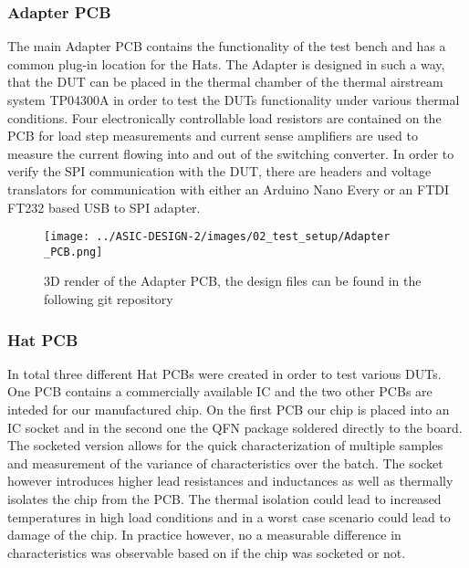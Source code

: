 \clearpage

\subsubsection{Adapter PCB}
The main Adapter \ac{PCB} contains the functionality of the test bench and has a common plug-in location for the Hats. The Adapter is designed in such a way, that the \ac{DUT} can be placed in the thermal chamber of the thermal airstream system TP04300A in order to test the \ac{DUT}s functionality under various thermal conditions. Four electronically controllable load resistors are contained on the \ac{PCB} for load step measurements and current sense amplifiers are used to measure the current flowing into and out of the switching converter. In order to verify the SPI communication with the \ac{DUT}, there are headers and voltage translators for communication with either an Arduino Nano Every or an FTDI FT232 based USB to SPI adapter.

\begin{figure}[h]
    \centering
    \texttt{[image: ../ASIC-DESIGN-2/images/02\_test\_setup/Adapter \_PCB.png]}
    \caption{3D render of the Adapter PCB, the design files can be found in the following git repository \cite{PCB_schematic}}
    \label{fig:Adapter_PCB}
\end{figure}

\clearpage

\subsubsection{Hat PCB}
In total three different Hat \ac{PCB}s were created in order to test various \ac{DUT}s. One \ac{PCB} contains a commercially available \ac{IC} and the two other \ac{PCB}s are inteded for our manufactured chip. On the first \ac{PCB} our chip is placed into an \ac{IC} socket and in the second one the QFN package soldered directly to the board. The socketed version allows for the quick characterization of multiple samples and measurement of the variance of characteristics over the batch. The socket however introduces higher lead resistances and inductances as well as thermally isolates the chip from the \ac{PCB}. The thermal isolation could lead to increased temperatures in high load conditions and in a worst case scenario could lead to damage of the chip. In practice however, no a measurable difference in characteristics was observable based on if the chip was socketed or not.\\


